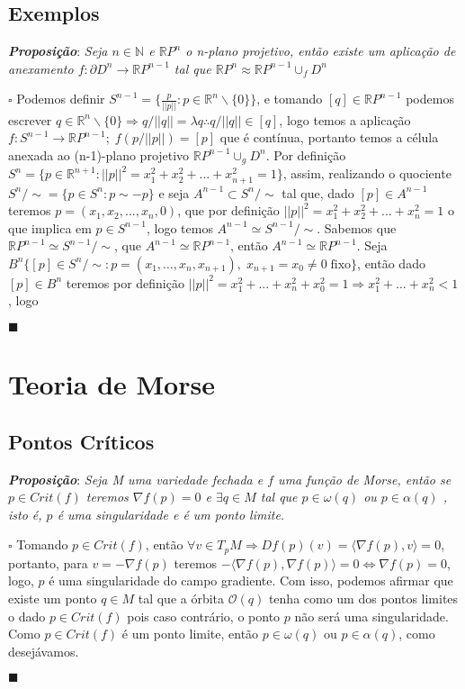 \documentclass[12pt]{book}
\newcommand{\real}[1]{\mathbb{R}^{#1}}
\newcommand{\realprojetivo}[1]{\mathbb{R}P^{#1}}
\newcommand{\tese}[3]{\vspace{2mm} \textit{\textbf{#1}}: \textit{#2} \par $\square$ #3 \par $\blacksquare$}
\newcommand{\innerprod}[2]{\langle #1, #2 \rangle}
\begin{document}
	\section{Exemplos}
	\tese{Proposição}{Seja $n \in \mathbb{N}$ e $\realprojetivo{n}$ o n-plano projetivo, então existe um aplicação de anexamento $f: \partial{D^{n}} \to \realprojetivo{n-1}$ tal que $\realprojetivo{n} \approx \realprojetivo{n-1} \cup_{f} D^{n}$}{Podemos definir $S^{n-1} =\{\frac{p}{||p||}: p  \in \real{n}\backslash\{0\}\}$, e tomando $[q] \in \realprojetivo{n-1}$ podemos escrever $q \in \real{n}\backslash\{0\} \Rightarrow q/||q|| = \lambda q \therefore q/||q|| \in [q]$, logo temos a aplicação  $f:S^{n-1} \to \realprojetivo{n-1}; \; f(p/||p||) = [p]$ que é contínua, portanto temos a célula anexada ao (n-1)-plano projetivo $\realprojetivo{n-1}\cup_{g}D^{n}$. Por definição $S^{n} = \{p \in \real{n+1}: ||p||^{2} = x_{1}^{2}+x_{2}^{2}+...+x_{n+1}^{2}=1\}$, assim, realizando o quociente $S^{n}/\sim = \{p \in S^{n}: p \sim -p\}$ e seja $A^{n-1} \subset S^{n}/\sim$ tal que, dado $[p] \in A^{n-1}$ teremos $p = (x_{1},x_{2},...,x_{n}, 0)$, que por definição $||p||^{2} = x_{1}^{2}+x_{2}^{2}+...+x_{n}^{2}=1$ o que implica em $p \in S^{n-1}$, logo temos $A^{n-1} \simeq S^{n-1}/\sim$. Sabemos que $\realprojetivo{n-1} \simeq S^{n-1}/\sim$, que $A^{n-1} \simeq \realprojetivo{n-1}$, então $A^{n-1} \simeq \realprojetivo{n-1}$. Seja $B^{n} \{[p] \in S^{n}/\sim: p =(x_{1},\dots,x_{n}, x_{n+1}), \; x_{n+1} = x_{0}\neq 0 \;\text{fixo} \}$, então dado $[p] \in B^{n}$ teremos por definição $||p||^{2} = x_{1}^{2}+...+x_{n}^{2}+x_{0}^{2}=1 \Rightarrow x_{1}^{2}+...+x_{n}^{2}<1$, logo }
	

	
	
	\chapter{Teoria de Morse}
	\section{Pontos Críticos}
	
	\tese{Proposição}{Seja M uma variedade fechada e $f$ uma função de Morse, então se $p \in Crit(f)$ teremos $\nabla f(p)=0$ e $\exists q \in M$ tal que $p \in \omega(q)$ ou $p \in \alpha(q)$ , isto é, $p$ é uma singularidade e é um ponto limite.}{Tomando $p \in Crit(f)$, então $\forall v \in T_{p}M \Rightarrow Df(p)(v) = \innerprod{\nabla f(p)}{v} = 0$, portanto, para $v = -\nabla f(p)$ teremos $-\innerprod{\nabla f(p)}{\nabla f(p)} = 0 \iff \nabla f(p) = 0$, logo, $p$ é uma singularidade do campo gradiente. Com isso, podemos afirmar que existe um ponto $q \in M$ tal que a órbita $\mathcal{O}(q)$ tenha como um dos pontos limites o dado $p \in Crit(f)$ pois caso contrário, o ponto $p$ não será uma singularidade. Como $p \in Crit(f)$ é um ponto limite, então $p \in \omega(q)$ ou $p \in \alpha(q)$, como desejávamos.}
	
\end{document}
